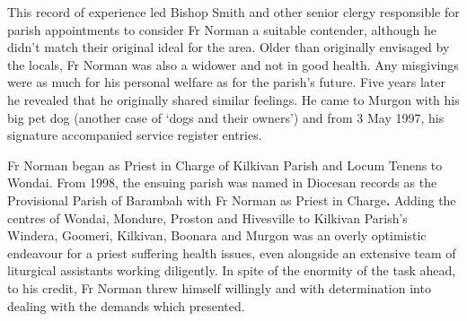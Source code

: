 This record of experience led Bishop Smith and other senior clergy responsible for parish appointments to consider Fr Norman a suitable contender, although he didn't match their original ideal for the area. Older than originally envisaged by the locals, Fr Norman was also a widower and not in good health. Any misgivings were as much for his personal welfare as for the parish's future. Five years later he revealed that he originally shared similar feelings. He came to Murgon with his big pet dog (another case of `dogs and their owners') and from 3 May 1997, his signature accompanied service register entries.



Fr Norman began as Priest in Charge of Kilkivan Parish and Locum Tenens to Wondai. From 1998, the ensuing parish was named in Diocesan records as the Provisional Parish of Barambah with Fr Norman as Priest in Charge\textbf{.} Adding the centres of Wondai, Mondure, Proston and Hivesville to Kilkivan Parish's Windera, Goomeri, Kilkivan, Boonara and Murgon was an overly optimistic endeavour for a priest suffering health issues, even alongside an extensive team of liturgical assistants working diligently. In spite of the enormity of the task ahead, to his credit, Fr Norman threw himself willingly and with determination into dealing with the demands which presented.









